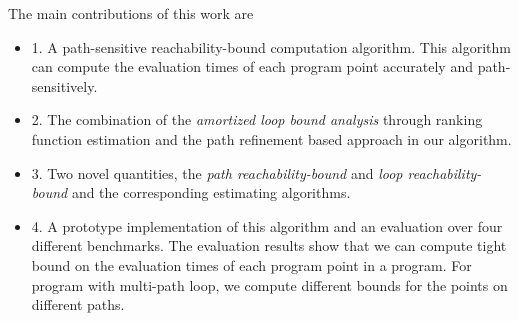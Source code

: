 The main contributions of this work are
\begin{itemize}
  \item 
1. A path-sensitive reachability-bound computation algorithm.
This algorithm can compute the evaluation times of each program point accurately and path-sensitively.
 \item 
2. The combination of the \emph{amortized loop bound analysis} through ranking function estimation and the path refinement based approach in our algorithm.
\item 
3. Two novel quantities, the \emph{path reachability-bound} and \emph{loop reachability-bound} and the corresponding estimating algorithms.
\item 
4. A prototype implementation of this algorithm and an evaluation over four different benchmarks.
  The evaluation results show that we can compute tight bound on the evaluation times of each program point in a program. For program with multi-path loop, we compute different bounds for the points on different paths.
\end{itemize}